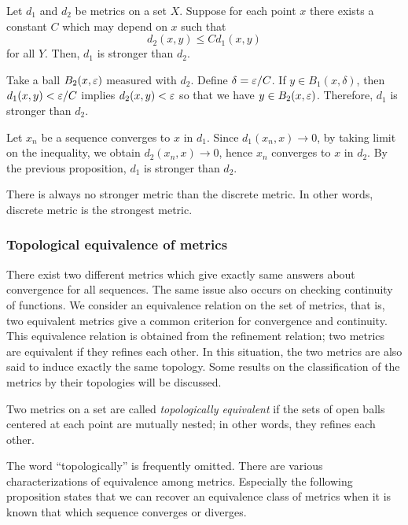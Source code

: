 \begin{prop}\label{prop:metric refinements can be described by inequality}
Let $d_1$ and $d_2$ be metrics on a set $X$.
Suppose for each point $x$ there exists a constant $C$ which may depend on $x$ such that
\[d_2(x,y)\le Cd_1(x,y)\]
for all $Y$.
Then, $d_1$ is stronger than $d_2$.
\end{prop}
\begin{pf}[1]
Take a ball $B_2(x,\varepsilon)$ measured with $d_2$.
Define $\delta=\varepsilon/C$.
If $y\in B_1(x,\delta)$, then $d_1(x,y)<\varepsilon/C$ implies $d_2(x,y)<\varepsilon$ so that we have $y\in B_2(x,\varepsilon)$.
Therefore, $d_1$ is stronger than $d_2$.
\end{pf}
\begin{pf}[2]
Let $x_n$ be a sequence converges to $x$ in $d_1$.
Since $d_1(x_n,x)\to0$, by taking limit on the inequality, we obtain $d_2(x_n,x)\to0$, hence $x_n$ converges to $x$ in $d_2$.
By the previous proposition, $d_1$ is stronger than $d_2$.
\end{pf}

\begin{ex}
There is always no stronger metric than the discrete metric.
In other words, discrete metric is the strongest metric.
\end{ex}

\subsubsection{Topological equivalence of metrics}

There exist two different metrics which give exactly same answers about convergence for all sequences.
The same issue also occurs on checking continuity of functions.
We consider an equivalence relation on the set of metrics, that is, two equivalent metrics give a common criterion for convergence and continuity.
This equivalence relation is obtained from the refinement relation; two metrics are equivalent if they refines each other.
In this situation, the two metrics are also said to induce exactly the same topology.
Some results on the classification of the metrics by their topologies will be discussed.

\begin{defn}
Two metrics on a set are called \emph{topologically equivalent} if the sets of open balls centered at each point are mutually nested; in other words, they refines each other.
\end{defn}

The word ``topologically'' is frequently omitted.
There are various characterizations of equivalence among metrics.
Especially the following proposition states that we can recover an equivalence class of metrics when it is known that which sequence converges or diverges.

